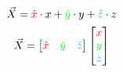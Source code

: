 \documentclass[preview]{standalone}
\begin{document}
$$\vec{X} = \textcolor{red}{\hat{x}}\cdot x + \textcolor{green}{\hat{y}}\cdot y + \textcolor{cyan}{\hat{z}}\cdot z$$
$$\vec{X} = \begin{bmatrix}\textcolor{red}{\hat{x}}&\textcolor{green}{\hat{y}}&\textcolor{cyan}{\hat{z}}\end{bmatrix}\begin{bmatrix}\textcolor{red}{x}\\\textcolor{green}{y}\\\textcolor{cyan}{z}\end{bmatrix}$$
\end{document}
